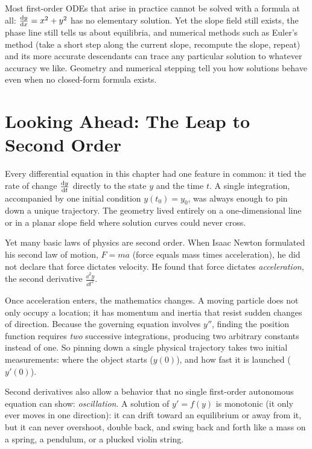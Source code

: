 \begin{aestheticbox}
Most first-order ODEs that arise in practice cannot be solved with a formula
at all: $\frac{\mathrm{d} y}{\mathrm{d} x}=x^2+y^2$ has no elementary solution. Yet the slope field still
exists, the phase line still tells us about equilibria, and numerical methods
such as Euler's method (take a short step along the current slope, recompute the
slope, repeat) and its more accurate descendants can trace any particular solution
to whatever accuracy we like. Geometry and numerical stepping tell you how
solutions behave even when no closed-form formula exists.
\end{aestheticbox}

\section{Looking Ahead: The Leap to Second Order}
\label{ch37:sec-looking-ahead}

Every differential equation in this chapter had one feature in common: it tied the
rate of change $\frac{\mathrm{d} y}{\mathrm{d} t}$ directly to the state $y$ and the time $t$. A single
integration, accompanied by one initial condition $y(t_0)=y_0$, was always enough
to pin down a unique trajectory. The geometry lived entirely on a one-dimensional line
or in a planar slope field where solution curves could never cross.

Yet many basic laws of physics are second order. When Isaac
Newton formulated his second law of motion, $F = ma$ (force equals mass times
acceleration), he did not declare that
force dictates velocity. He found that force dictates \emph{acceleration}, the
second derivative $\frac{\dd^2 y}{\dd t^2}$.

Once acceleration enters, the mathematics changes.
A moving particle does not only occupy a location; it has momentum and
inertia that resist sudden changes of direction. Because the governing equation involves
$y''$, finding the position function requires \emph{two} successive integrations,
producing two arbitrary constants instead of one. So pinning down a single
physical trajectory takes two initial measurements: where the object starts
($y(0)$), and how fast it is launched ($y'(0)$).

Second derivatives also allow a behavior that no single
first-order autonomous equation can show: \emph{oscillation}. A solution of
$y'=f(y)$ is monotonic (it only ever moves in one direction): it can drift toward
an equilibrium or away from it, but it can never overshoot, double back, and swing
back and forth like a mass on a spring, a pendulum, or a plucked violin string.

